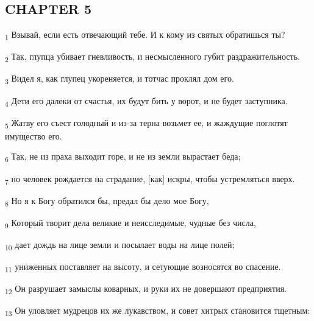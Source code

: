 \subsection{CHAPTER 5}
\begin{tcolorbox}
\textsubscript{1} Взывай, если есть отвечающий тебе. И к кому из святых обратишься ты?
\end{tcolorbox}
\begin{tcolorbox}
\textsubscript{2} Так, глупца убивает гневливость, и несмысленного губит раздражительность.
\end{tcolorbox}
\begin{tcolorbox}
\textsubscript{3} Видел я, как глупец укореняется, и тотчас проклял дом его.
\end{tcolorbox}
\begin{tcolorbox}
\textsubscript{4} Дети его далеки от счастья, их будут бить у ворот, и не будет заступника.
\end{tcolorbox}
\begin{tcolorbox}
\textsubscript{5} Жатву его съест голодный и из-за терна возьмет ее, и жаждущие поглотят имущество его.
\end{tcolorbox}
\begin{tcolorbox}
\textsubscript{6} Так, не из праха выходит горе, и не из земли вырастает беда;
\end{tcolorbox}
\begin{tcolorbox}
\textsubscript{7} но человек рождается на страдание, [как] искры, чтобы устремляться вверх.
\end{tcolorbox}
\begin{tcolorbox}
\textsubscript{8} Но я к Богу обратился бы, предал бы дело мое Богу,
\end{tcolorbox}
\begin{tcolorbox}
\textsubscript{9} Который творит дела великие и неисследимые, чудные без числа,
\end{tcolorbox}
\begin{tcolorbox}
\textsubscript{10} дает дождь на лице земли и посылает воды на лице полей;
\end{tcolorbox}
\begin{tcolorbox}
\textsubscript{11} униженных поставляет на высоту, и сетующие возносятся во спасение.
\end{tcolorbox}
\begin{tcolorbox}
\textsubscript{12} Он разрушает замыслы коварных, и руки их не довершают предприятия.
\end{tcolorbox}
\begin{tcolorbox}
\textsubscript{13} Он уловляет мудрецов их же лукавством, и совет хитрых становится тщетным:
\end{tcolorbox}
